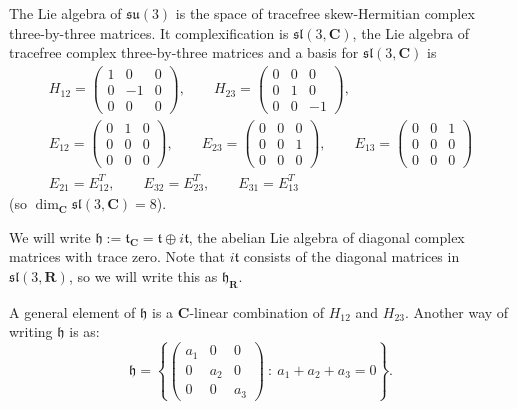 \documentclass[12pt]{article}
\newcommand{\CC}{\mathbf{C}}
\newcommand{\RR}{\mathbf{R}}
\theoremstyle{definition}
\theoremstyle{check}
\theoremstyle{remark}
\theoremstyle{TheoremNum}
\begin{document}
The Lie algebra of $\mathfrak{su}(3)$ is the space of tracefree skew-Hermitian complex three-by-three matrices. It complexification is $\mathfrak{sl}(3,\CC)$, the Lie algebra of tracefree complex three-by-three matrices and a basis for $\mathfrak{sl}(3,\CC)$ is
\begin{gather*}
H_{12}=\left(\begin{array}{ccc}
1 & 0 & 0\\
0 & -1 & 0\\
0 & 0 & 0
\end{array}\right),\qquad H_{23}=\left(\begin{array}{ccc}
0 & 0 & 0\\
0 & 1 & 0\\
0 & 0 & -1
\end{array}\right),\\
E_{12}=\left(\begin{array}{ccc}
0 & 1 & 0\\
0 & 0 & 0\\
0 & 0 & 0
\end{array}\right),\qquad E_{23}=\left(\begin{array}{ccc}
0 & 0 & 0\\
0 & 0 & 1\\
0 & 0 & 0
\end{array}\right),\qquad E_{13}=\left(\begin{array}{ccc}
0 & 0 & 1\\
0 & 0 & 0\\
0 & 0 & 0
\end{array}\right)\\
E_{21}=E_{12}^T,\qquad E_{32}=E_{23}^T,\qquad E_{31}=E_{13}^T
\end{gather*}
(so $\dim_{\CC}\mathfrak{sl}(3,\CC)=8$).

We will write $\mathfrak{h}:=\mathfrak{t}_{\CC}=\mathfrak{t}\oplus i\mathfrak{t}$, the abelian Lie algebra of diagonal complex matrices with trace zero. Note that $i\mathfrak{t}$ consists of the diagonal matrices in $\mathfrak{sl}(3,\RR)$, so we will write this as $\mathfrak{h}_{\RR}$.

A general element of $\mathfrak{h}$ is a $\CC$-linear combination of $H_{12}$ and $H_{23}$. Another way of writing $\mathfrak{h}$ is as:
\[\mathfrak{h}=\left\{\left(\begin{array}{ccc}
a_1 & 0 & 0\\
0 & a_2 & 0\\
0 & 0 & a_3
\end{array}\right)\ :\ a_1+a_2+a_3=0\right\}.\]
\end{document}
